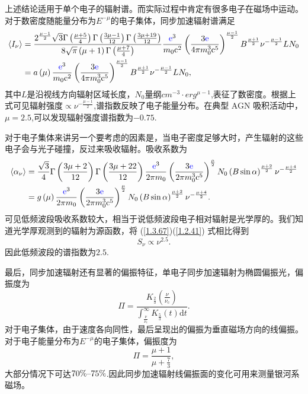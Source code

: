 \documentclass[../天体物理基础.tex]{subfiles}
\begin{document}
上述结论适用于单个电子的辐射谱。而实际过程中肯定有很多电子在磁场中运动。对于数密度随能量分布为$E^{-\mu}$的电子集体，同步加速辐射谱满足
\begin{align}
\langle I_{\nu}\rangle&=\frac{2^{\frac{\mu-1}{2}}\sqrt3\Gamma\left(\frac{\mu+5}{4}\right)\Gamma\left(\frac{3\mu-1}{12}\right)\Gamma\left(\frac{3\mu+19}{12}\right)}{8\sqrt\pi\left(\mu+1\right)\Gamma\left(\frac{\mu+7}{4}\right)}\frac{{\color{blue}{\ce{e}}}^{3}}{m_{0}\mathrm{c}^{2}}\left(\frac{3{\color{blue}{\ce{e}}}}{4\pi m_{0}^{3}\mathrm{c}^{5}}\right)^{\frac{\mu-1}2}B^{\frac{\mu+1}{2}}\nu^{-\frac{\mu-1}{2}}LN_{0}\notag\\
&=a\left(\mu\right)\frac{{\color{blue}{\ce{e}}}^{3}}{m_{0}\mathrm{c}^{2}}\left(\frac{3{\color{blue}{\ce{e}}}}{4\pi m_{0}^{3}\mathrm{c}^{5}}\right)^{\frac{\mu-1}2}B^{\frac{\mu+1}{2}}\nu^{-\frac{\mu-1}{2}}LN_{0},\label{1.3.67}
\end{align}
其中$L$是沿视线方向辐射区域长度，$N_{0}$量纲$\unit{cm^{-3}\cdot erg^{\mu-1}}$,表征了数密度。根据上式可见辐射强度$\propto{}\nu^{-\frac{\mu-1}{2}}$,谱指数反映了电子能量分布。在典型 AGN 吸积活动中，$\mu=2.5$,可以发现辐射强度谱指数为$-0.75$.

对于电子集体来讲另一个要考虑的因素是，当电子密度足够大时，产生辐射的这些电子会与光子碰撞，反过来吸收辐射。吸收系数为
\begin{align}
\langle{}\alpha_{\nu}\rangle&=\frac{\sqrt{3}}{4}\Gamma\left(\frac{3\mu+2}{12}\right)\Gamma\left(\frac{3\mu+22}{12}\right)\frac{{\color{blue}{\ce{e}}}^{3}}{2\pi m_{0}}\left(\frac{3{\color{blue}{\ce{e}}}}{2\pi m_{0}^{3}\mathrm{c}^{5}}\right)^{\frac{\mu}{2}}N_{0}\left(B\sin\alpha\right)^{\frac{\mu+2}{2}}\nu^{-\frac{\mu+4}{2}}\notag\\
&=g\left(\mu\right)\frac{{\color{blue}{\ce{e}}}^{3}}{2\pi m_{0}}\left(\frac{3{\color{blue}{\ce{e}}}}{2\pi m_{0}^{3}\mathrm{c}^{5}}\right)^{\frac{\mu}{2}}N_{0}\left(B\sin\alpha\right)^{\frac{\mu+2}{2}}\nu^{-\frac{\mu+4}{2}}.\label{1.2.41}
\end{align}
可见低频波段吸收系数较大，相当于说低频波段电子相对辐射是光学厚的。我们知道光学厚观测到的辐射为源函数，将 (\ref{1.3.67})(\ref{1.2.41}) 式相比得到
\begin{equation}
S_{\nu}\propto{}\nu^{2.5}.
\end{equation}
因此低频波段的谱指数为$2.5$.

最后，同步加速辐射还有显著的偏振特征，单电子同步加速辐射为椭圆偏振光，偏振度为
\begin{equation}
\Pi=\frac{K_{\frac{2}{3}}\left(\frac{\nu}{\nu_\mathrm{c}}\right)}{\int_{\frac{\nu}{\nu_\mathrm{c}}}^{\infty}K_{\frac{5}{3}}\left(t\right)\mathrm{d}t}.
\end{equation}
对于电子集体，由于速度各向同性，最后呈现出的偏振为垂直磁场方向的线偏振。对于电子能量分布为$E^{-\mu}$的电子集体，偏振度为
\begin{equation}
\Pi=\frac{\mu+1}{\mu+\frac{7}{3}},
\end{equation}
大部分情况下可达$70\%\text{\textendash}75\%$.因此同步加速辐射线偏振面的变化可用来测量银河系磁场。
\end{document}
